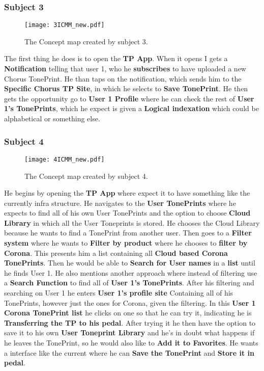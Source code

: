 \subsubsection{Subject 3}
\label{Subject3ICMM}
\begin{figure}[H]
	\centering
	\texttt{[image: 3ICMM\_new.pdf]}
	\caption{The Concept map created by subject 3.}
	\label{fig:ICMM3}
\end{figure}

The first thing he does is to open the \textbf{TP App}. When it opens I gets a \textbf{Notification} telling that user 1, who he \textbf{subscribes} to have uploaded a new Chorus TonePrint. He than taps on the notification, which sends him to the \textbf{Specific Chorus TP Site}, in which he selects to \textbf{Save TonePrint}. He then gets the opportunity go to \textbf{User 1 Profile} where he can check the rest of \textbf{User 1’s TonePrints}, which he expect is given a \textbf{Logical indexation} which could be alphabetical or something else.

\subsubsection{Subject 4}
\label{Subject4ICMM}
\begin{figure}[H]
	\centering
	\texttt{[image: 4ICMM\_new.pdf]}
	\caption{The Concept map created by subject 4.}
	\label{fig:ICMM4}
\end{figure}

He begins by opening the \textbf{TP App} where expect it to have something like the currently infra structure. He navigates to the \textbf{User TonePrints} where he expects to find all of his own User TonePrints and the option to choose \textbf{Cloud Library} in which all the User Toneprints is stored. He chooses the Cloud Library because he wants to find a TonePrint from another user. Then goes to a \textbf{Filter system} where he wants to \textbf{Filter by product} where he chooses to \textbf{filter by Corona}. This presents him a list containing all \textbf{Cloud based Corona TonePrints}. Then he would be able to \textbf{Search for User names} in a \textbf{list} until he finds User 1. He also mentions another approach where instead of filtering use a \textbf{Search Function} to find all of \textbf{User 1’s TonePrints}. After his filtering and searching on User 1 he enters \textbf{User 1’s profile site} Containing all of his TonePrints, however just the ones for Corona, given the filtering. In this \textbf{User 1 Corona TonePrint list} he clicks on one so that he can try it, indicating he is \textbf{Transferring the TP to his pedal}. After trying it he then have the option to save it to his own \textbf{User Toneprint Library} and he’s in doubt what happens if he leaves the TonePrint, so he would also like to \textbf{Add it to Favorites}. He wants a interface like the current where he can \textbf{Save the TonePrint} and \textbf{Store it in pedal}.

